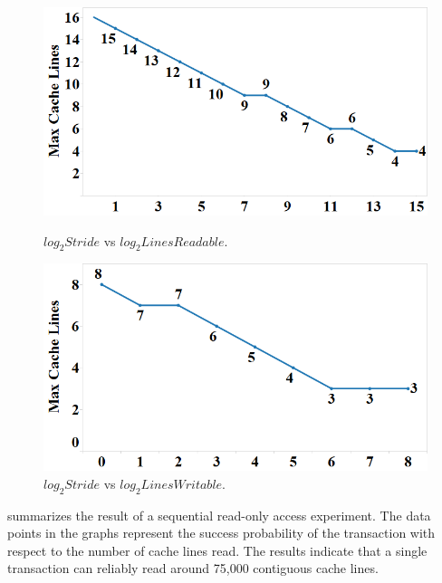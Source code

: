 \begin{figure}[h]
\centering
\begin{minipage}[b]{.45\linewidth}
\centering
\includegraphics[width=\linewidth]{images/wttm_stride_read_intel}
\caption{$log_2{Stride}$ vs $log_2{Lines Readable}$.}
\label{fig:wttm_stride_read_intel}
\end{minipage}%
\quad
\begin{minipage}[b]{.45\linewidth}
\centering
\includegraphics[width=\linewidth]{images/wttm_stride_write_intel}
\caption{$log_2{Stride}$ vs $log_2{Lines Writable}$.}
\label{fig:wttm_stride_write_intel}
\end{minipage}
\end{figure}

 summarizes the result of a sequential
read-only access experiment. The data points in the graphs represent the success
probability of the transaction with respect to the number of cache lines read.
The results indicate that a single transaction can reliably read 
around 75,000 contiguous cache lines.

